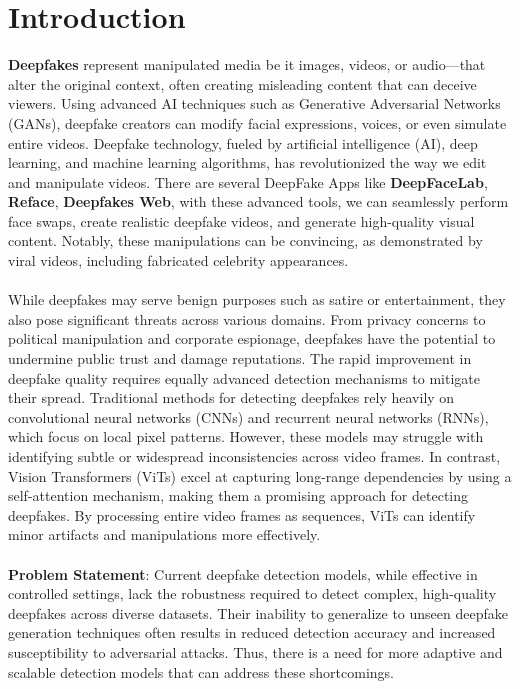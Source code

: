 \section{Introduction}
\textbf{Deepfakes} represent manipulated media be it images, videos, or audio—that alter the original context, often creating misleading content that can deceive viewers. Using advanced AI techniques such as Generative Adversarial Networks (GANs), deepfake creators can modify facial expressions, voices, or even simulate entire videos. Deepfake technology, fueled by artificial intelligence (AI), deep learning, and machine learning algorithms, has revolutionized the way we edit and manipulate videos. There are several DeepFake Apps like \textbf{DeepFaceLab}, \textbf{Reface}, \textbf{Deepfakes Web}, with these advanced tools, we can seamlessly perform face swaps, create realistic deepfake videos, and generate high-quality visual content. Notably, these manipulations can be convincing, as demonstrated by viral videos, including fabricated celebrity appearances.\\\\
While deepfakes may serve benign purposes such as satire or entertainment, they also pose significant threats across various domains. From privacy concerns to political manipulation and corporate espionage, deepfakes have the potential to undermine public trust and damage reputations. The rapid improvement in deepfake quality requires equally advanced detection mechanisms to mitigate their spread. Traditional methods for detecting deepfakes rely heavily on convolutional neural networks (CNNs) and recurrent neural networks (RNNs), which focus on local pixel patterns. However, these models may struggle with identifying subtle or widespread inconsistencies across video frames. In contrast, Vision Transformers (ViTs) excel at capturing long-range dependencies by using a self-attention mechanism, making them a promising approach for detecting deepfakes. By processing entire video frames as sequences, ViTs can identify minor artifacts and manipulations more effectively.\\\\
\textbf{Problem Statement}: Current deepfake detection models, while effective in controlled settings, lack the robustness required to detect complex, high-quality deepfakes across diverse datasets. Their inability to generalize to unseen deepfake generation techniques often results in reduced detection accuracy and increased susceptibility to adversarial attacks. Thus, there is a need for more adaptive and scalable detection models that can address these shortcomings.\\\\
